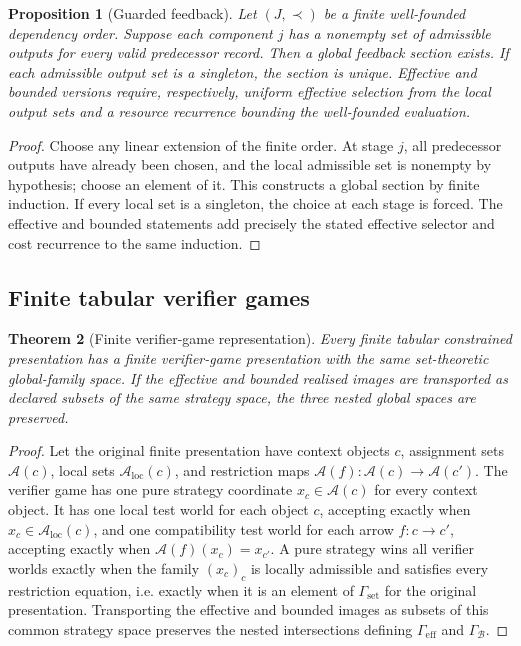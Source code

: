 \documentclass[11pt]{article}
\theoremstyle{plain}
\newtheorem{theorem}{Theorem}[section]
\newtheorem{proposition}[theorem]{Proposition}
\theoremstyle{definition}
\theoremstyle{remark}
\newcommand{\LocalAdm}{\mathcal{A}_{\mathrm{loc}}}
\begin{document}
\begin{proposition}[Guarded feedback]
\label{prop:guarded-feedback-monograph}
Let $(J,\prec)$ be a finite well-founded dependency order. Suppose each component
$j$ has a nonempty set of admissible outputs for every valid predecessor record.
Then a global feedback section exists. If each admissible output set is a
singleton, the section is unique. Effective and bounded versions require,
respectively, uniform effective selection from the local output sets and a
resource recurrence bounding the well-founded evaluation.
\end{proposition}

\begin{proof}
Choose any linear extension of the finite order. At stage $j$, all predecessor
outputs have already been chosen, and the local admissible set is nonempty by
hypothesis; choose an element of it. This constructs a global section by finite
induction. If every local set is a singleton, the choice at each stage is forced.
The effective and bounded statements add precisely the stated effective selector
and cost recurrence to the same induction.
\end{proof}

\subsection{Finite tabular verifier games}

\begin{theorem}[Finite verifier-game representation]
\label{thm:finite-verifier-game-representation}
Every finite tabular constrained presentation has a finite verifier-game
presentation with the same set-theoretic global-family space. If the effective
and bounded realised images are transported as declared subsets of the same
strategy space, the three nested global spaces are preserved.
\end{theorem}

\begin{proof}
Let the original finite presentation have context objects $c$, assignment sets
$\mathcal A(c)$, local sets $\LocalAdm(c)$, and restriction maps
$\mathcal A(f):\mathcal A(c)\to\mathcal A(c')$. The verifier game has one pure
strategy coordinate $x_c\in\mathcal A(c)$ for every context object. It has one
local test world for each object $c$, accepting exactly when
$x_c\in\LocalAdm(c)$, and one compatibility test world for each arrow
$f:c\to c'$, accepting exactly when $\mathcal A(f)(x_c)=x_{c'}$. A pure strategy
wins all verifier worlds exactly when the family $(x_c)_c$ is locally admissible
and satisfies every restriction equation, i.e. exactly when it is an element of
$\Gamma_{\mathrm{set}}$ for the original presentation. Transporting the effective
and bounded images as subsets of this common strategy space preserves the nested
intersections defining $\Gamma_{\mathrm{eff}}$ and $\Gamma_{\mathcal B}$.
\end{proof}
\end{document}
